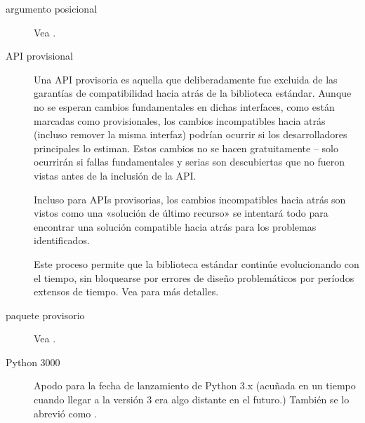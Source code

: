\documentclass[a4,10pt,spanish]{sphinxmanual}
\begin{document}
\begin{description}
\item[{argumento posicional\label{\detokenize{glossary:term-positional-argument}}}] \leavevmode
\sphinxAtStartPar
Vea {\hyperref[\detokenize{glossary:term-argument}]{}}.

\item[{API provisional\label{\detokenize{glossary:term-provisional-API}}}] \leavevmode
\sphinxAtStartPar
Una API provisoria es aquella que deliberadamente fue excluida de las garantías de compatibilidad hacia atrás de la biblioteca estándar.  Aunque no se esperan cambios fundamentales en dichas interfaces, como están marcadas como provisionales, los cambios incompatibles hacia atrás (incluso remover la misma interfaz) podrían ocurrir si los desarrolladores principales lo estiman.  Estos cambios no se hacen gratuitamente – solo ocurrirán si fallas fundamentales y serias son descubiertas que no fueron vistas antes de la inclusión de la API.

\sphinxAtStartPar
Incluso para APIs provisorias, los cambios incompatibles hacia atrás son vistos como una «solución de último recurso» \sphinxhyphen{} se intentará todo para encontrar una solución compatible hacia atrás para los problemas identificados.

\sphinxAtStartPar
Este proceso permite que la biblioteca estándar continúe evolucionando con el tiempo, sin bloquearse por errores de diseño problemáticos por períodos extensos de tiempo. Vea  para más detalles.

\item[{paquete provisorio\label{\detokenize{glossary:term-provisional-package}}}] \leavevmode
\sphinxAtStartPar
Vea {\hyperref[\detokenize{glossary:term-provisional-API}]{}}.

\item[{Python 3000\label{\detokenize{glossary:term-Python-3000}}}] \leavevmode
\sphinxAtStartPar
Apodo para la fecha de lanzamiento de Python 3.x (acuñada en un tiempo cuando llegar a la versión 3 era algo distante en el futuro.)  También se lo abrevió como .


\end{description}
\end{document}
